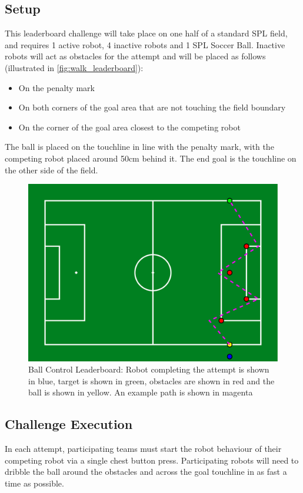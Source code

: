 \subsection{Setup}
This leaderboard challenge will take place on one half of a standard SPL field, and requires 1 active robot, 4 inactive robots and 1 SPL Soccer Ball.
Inactive robots will act as obstacles for the attempt and will be placed as follows (illustrated in \cref{fig:walk_leaderboard}):
\begin{itemize}
    \item On the penalty mark
    \item On both corners of the goal area that are not touching the field boundary
    \item On the corner of the goal area closest to the competing robot
\end{itemize}
The ball is placed on the touchline in line with the penalty mark, with the competing
robot placed around 50cm behind it.
The end goal is the touchline on the other side of the field.

\begin{figure}[t]
    \centerline{\includegraphics[width=\columnwidth]{figs/control_leaderboard.pdf}}
    \caption{Ball Control Leaderboard: Robot completing the attempt is shown in blue, target is shown in green, obstacles are shown in red and the ball is shown in yellow. An example path is shown in magenta}
    \label{fig:ball_control_leaderboard}
\end{figure}

\subsection{Challenge Execution}
In each attempt, participating teams must start the robot behaviour of their competing robot via a single chest button
press. Participating robots will need to dribble the ball around the obstacles and across
the goal touchline in as fast a time as possible.

